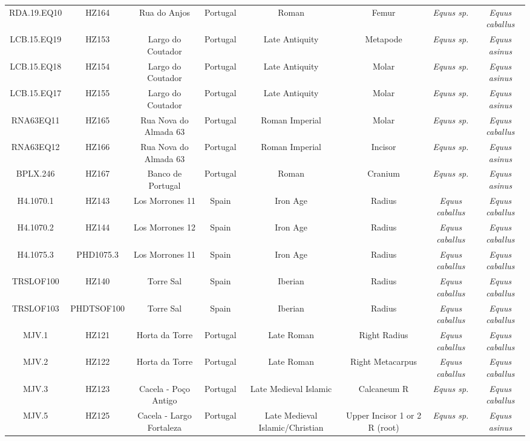 \documentclass[preprint, 3p, authoryear]{elsarticle} %
\begin{document}
\begin{landscape}
\begin{table}
\begin{tabular}[t]{cccccc>{}c>{}c}
RDA.19.EQ10 & HZ164 & Rua do Anjos & Portugal & Roman & Femur & \em{Equus {\normalfont sp.}} & \em{Equus caballus}\\
LCB.15.EQ19 & HZ153 & Largo do Coutador & Portugal & Late Antiquity & Metapode & \em{Equus {\normalfont sp.}} & \em{Equus asinus}\\
LCB.15.EQ18 & HZ154 & Largo do Coutador & Portugal & Late Antiquity & Molar & \em{Equus {\normalfont sp.}} & \em{Equus asinus}\\
LCB.15.EQ17 & HZ155 & Largo do Coutador & Portugal & Late Antiquity & Molar & \em{Equus {\normalfont sp.}} & \em{Equus asinus}\\
RNA63EQ11 & HZ165 & Rua Nova do Almada 63 & Portugal & Roman Imperial & Molar & \em{Equus {\normalfont sp.}} & \em{Equus caballus}\\
RNA63EQ12 & HZ166 & Rua Nova do Almada 63 & Portugal & Roman Imperial & Incisor & \em{Equus {\normalfont sp.}} & \em{Equus asinus}\\
BPLX.246 & HZ167 & Banco de Portugal & Portugal & Roman & Cranium & \em{Equus {\normalfont sp.}} & \em{Equus asinus}\\
H4.1070.1 & HZ143 & Los Morrones 11 & Spain & Iron Age & Radius & \em{Equus caballus} & \em{Equus caballus}\\
H4.1070.2 & HZ144 & Los Morrones 12 & Spain & Iron Age & Radius & \em{Equus caballus} & \em{Equus caballus}\\
H4.1075.3 & PHD1075.3 & Los Morrones 11 & Spain & Iron Age & Radius & \em{Equus caballus} & \em{Equus caballus}\\
TRSLOF100 & HZ140 & Torre Sal & Spain & Iberian & Radius & \em{Equus caballus} & \em{Equus caballus}\\
TRSLOF103 & PHDTSOF100 & Torre Sal & Spain & Iberian & Radius & \em{Equus caballus} & \em{Equus caballus}\\
MJV.1 & HZ121 & Horta da Torre & Portugal & Late Roman & Right Radius & \em{Equus caballus} & \em{Equus caballus}\\
MJV.2 & HZ122 & Horta da Torre & Portugal & Late Roman & Right Metacarpus & \em{Equus caballus} & \em{Equus caballus}\\
MJV.3 & HZ123 & Cacela - Po\c{c}o Antigo & Portugal & Late Medieval Islamic & Calcaneum R & \em{Equus {\normalfont sp.}} & \em{Equus caballus}\\
MJV.5 & HZ125 & Cacela - Largo Fortaleza & Portugal & Late Medieval Islamic/Christian & Upper Incisor 1 or 2 R (root) & \em{Equus {\normalfont sp.}} & \em{Equus asinus}\\

\end{tabular}
\end{table}
\end{landscape}
\end{document}
